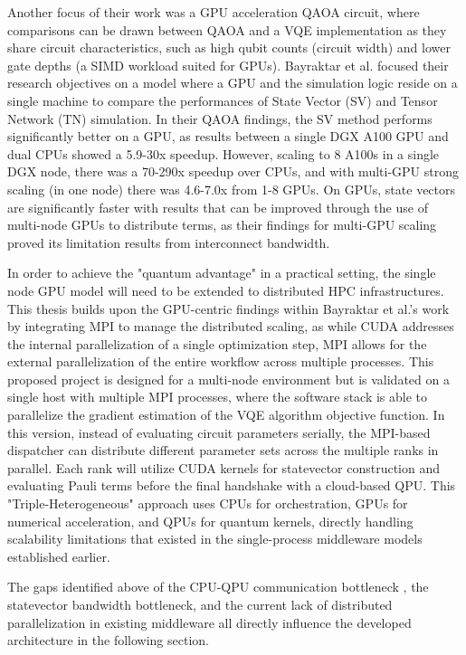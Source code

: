 Another focus of their work was a GPU acceleration QAOA circuit, where comparisons can be drawn between 
QAOA and a VQE implementation as they share circuit characteristics, such as high qubit counts (circuit width) and lower gate depths (a SIMD workload suited for GPUs). 
Bayraktar et al. focused their research objectives on a model where a GPU and the simulation
logic reside on a single machine to compare the performances of 
State Vector (SV) and Tensor Network (TN) simulation. In their QAOA findings, the SV method performs significantly better on a GPU, as results 
between a single DGX A100 GPU and dual CPUs showed a  5.9-30x speedup. However, scaling to 8 A100s in a single DGX node, 
there was a 70-290x speedup over CPUs, and with multi-GPU strong scaling (in one node) there was 4.6-7.0x from 1-8 GPUs.
On GPUs, state vectors are significantly faster with results that can be 
improved through the use of multi-node GPUs to distribute terms, as their findings for multi-GPU scaling proved its limitation 
results from interconnect bandwidth. \parencite{bayraktar2023cuquantum}

In order to achieve the "quantum advantage" \parencite{harrow2017quantumsupremacy} in a practical setting, the single node GPU model will need to be extended to 
distributed HPC infrastructures. This thesis builds upon the GPU-centric findings within Bayraktar et al.'s work by integrating MPI to 
manage the distributed scaling, as while CUDA addresses the internal parallelization of a single optimization step, MPI 
allows for the external parallelization of the entire workflow across multiple processes. This proposed project is designed for a multi-node environment but is validated on a single host with multiple MPI processes, 
where the software stack is able to parallelize the gradient estimation of the VQE algorithm objective function. In this version, 
instead of evaluating circuit parameters serially, the MPI-based dispatcher can distribute different parameter sets across the multiple 
ranks in parallel. Each rank will utilize CUDA kernels for statevector construction and evaluating Pauli terms before the final handshake with a 
cloud-based QPU. This "Triple-Heterogeneous" approach uses CPUs for orchestration, GPUs for numerical acceleration, and QPUs 
for quantum kernels, directly handling scalability limitations that existed in the single-process middleware models established earlier. 

The gaps identified above of the CPU-QPU communication bottleneck \parencite{cruise2020practicalquantumcomputingvalue}, the statevector bandwidth bottleneck, and 
the current lack of distributed parallelization in existing middleware all directly influence the developed architecture in the following section.

